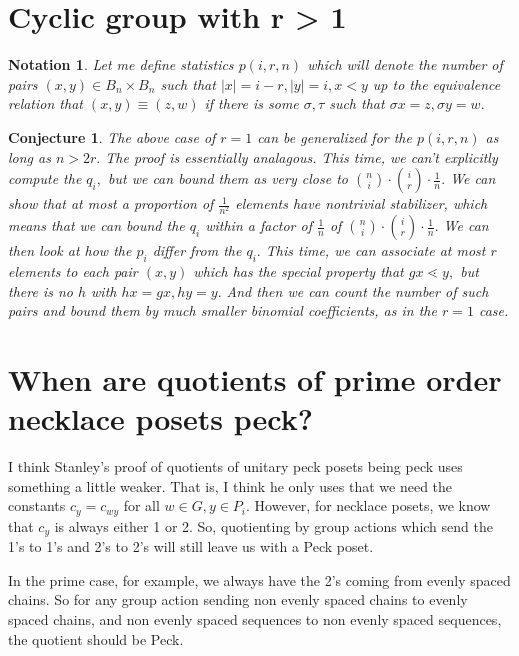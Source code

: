 \documentclass{amsart}
\newtheorem{conj}{Conjecture}
\newtheorem{note}[subsubsection]{Notation}
\begin{document}
\section{Cyclic group with r > 1}

\begin{note}
Let me define statistics $p(i,r,n)$ which will denote the number of pairs $(x,y) \in B_n \times B_n$ such that $|x| = i-r,|y| = i,x<y$ up to the equivalence relation that $(x,y) \equiv (z,w)$ if there is some $\sigma,\tau$ such that $\sigma x = z,\sigma y = w.$
\end{note}

\begin{conj}
The above case of $r =1$ can be generalized for the $p(i,r,n)$ as long as $n > 2r.$ The proof is essentially analagous. This time, we can't explicitly compute the $q_i,$ but we can bound them as very close to $\binom n i \cdot \binom i r \cdot \frac{1}{n}.$ We can show that at most a proportion of $\frac{1}{n^2}$ elements have nontrivial stabilizer, which means that we can bound the $q_i$ within a factor of $\frac{1}{n}$ of $\binom n i \cdot \binom i r \cdot \frac{1}{n}.$ We can then look at how the $p_i$ differ from the $q_i.$ This time, we can associate at most $r$ elements to each pair $(x,y)$ which has the special property that $gx \lessdot y,$ but there is no $h$ with $hx = gx, hy = y.$ And then we can count the number of such pairs and bound them by much smaller binomial coefficients, as in the $r = 1$ case.
\end{conj}

\section{When are quotients of prime order necklace posets peck?}

I think Stanley's proof of quotients of unitary peck posets being peck uses something a little weaker. That is, I think he only uses that we need the constants $c_y = c_{wy}$ for all $w \in G,y \in P_i.$ However, for necklace posets, we know that $c_y$ is always either 1 or 2. So, quotienting by group actions which send the 1's to 1's and 2's to 2's will still leave us with a Peck poset.

In the prime case, for example, we always have the 2's coming from evenly spaced chains. So for any group action sending non evenly spaced chains to evenly spaced chains, and non evenly spaced sequences to non evenly spaced sequences, the quotient should be Peck. 
\end{document}
